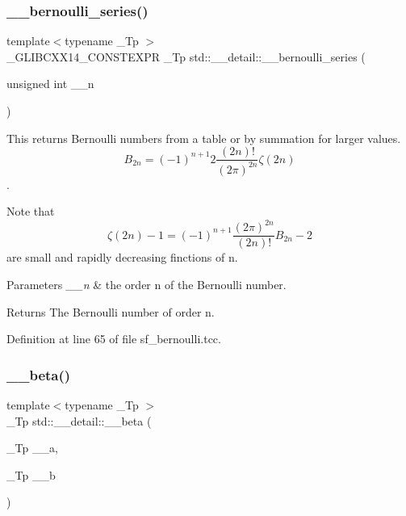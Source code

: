 \mbox{\label{namespacestd_1_1____detail_ad3d3e44d340742b0362a8ad95080d315}} 
\subsubsection{\texorpdfstring{\+\_\+\+\_\+bernoulli\+\_\+series()}{\_\_bernoulli\_series()}}
{\footnotesize\ttfamily template$<$typename \+\_\+\+Tp $>$ \\
\+\_\+\+G\+L\+I\+B\+C\+X\+X14\+\_\+\+C\+O\+N\+S\+T\+E\+X\+PR \+\_\+\+Tp std\+::\+\_\+\+\_\+detail\+::\+\_\+\+\_\+bernoulli\+\_\+series (\begin{DoxyParamCaption}\item[{unsigned int}]{\+\_\+\+\_\+n }\end{DoxyParamCaption})}



This returns Bernoulli numbers from a table or by summation for larger values. \[ B_{2n} = (-1)^{n+1} 2\frac{(2n)!}{(2\pi)^{2n}} \zeta(2n) \]. 

Note that \[ \zeta(2n) - 1 = (-1)^{n+1} \frac{(2\pi)^{2n}}{(2n)!} B_{2n} - 2 \] are small and rapidly decreasing finctions of n.


\begin{DoxyParams}{Parameters}
{\em \+\_\+\+\_\+n} & the order n of the Bernoulli number. \\
\hline
\end{DoxyParams}
\begin{DoxyReturn}{Returns}
The Bernoulli number of order n. 
\end{DoxyReturn}


Definition at line 65 of file sf\+\_\+bernoulli.\+tcc.

\mbox{\label{namespacestd_1_1____detail_a090d2f0920e0d208c467609b2a81d717}} 
\subsubsection{\texorpdfstring{\+\_\+\+\_\+beta()}{\_\_beta()}}
{\footnotesize\ttfamily template$<$typename \+\_\+\+Tp $>$ \\
\+\_\+\+Tp std\+::\+\_\+\+\_\+detail\+::\+\_\+\+\_\+beta (\begin{DoxyParamCaption}\item[{\+\_\+\+Tp}]{\+\_\+\+\_\+a,  }\item[{\+\_\+\+Tp}]{\+\_\+\+\_\+b }\end{DoxyParamCaption})}



